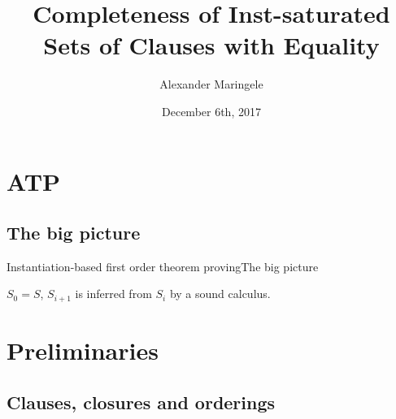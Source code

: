 \documentclass[%
handout,
]{beamer}
\title[Completeness of Inst-Saturation]{Completeness of Inst-saturated\\Sets of Clauses with Equality}
\author[{A$\ell$M}]{%
	Alexander Maringele
}
\institute[UIBK]{%
	{alexander.maringele@gmail.com}
}
\date{December 6th, 2017}
\begin{document}
\titleframe

\begin{frame}
    \nocite{GK2004csl} %
    
    
\end{frame}

\section{ATP}
\subsection{The big picture}
\begin{frame}{Instantiation-based first order theorem proving}{The big picture}

    \vspace{0.7em}
    

    \vspace{0.7em}
    $S_0 = S$, $S_{i+1}$ is inferred from $S_i$ by a sound calculus.
\end{frame}


\section{Preliminaries}

\subsection{Clauses, closures and orderings}
\end{document}
